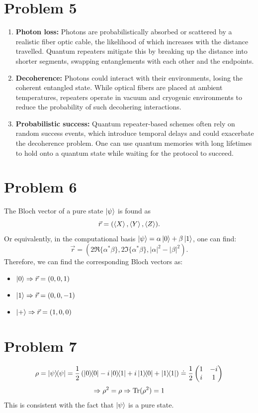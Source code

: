 \documentclass[11pt]{article}
\begin{document}
\section*{Problem 5}
\begin{enumerate}
    \item \textbf{Photon loss:}
        Photons are probabilistically absorbed or scattered by a realistic fiber optic cable,
        the likelihood of which increases with the distance travelled.
        Quantum repeaters mitigate this by breaking up the distance into shorter segments,
        swapping entanglements with each other and the endpoints.

    \item \textbf{Decoherence:}
        Photons could interact with their environments, losing the coherent entangled state.
        While optical fibers are placed at ambient temperatures,
        repeaters operate in vacuum and cryogenic environments
        to reduce the probability of such decohering interactions.

    \item \textbf{Probabilistic success:}
        Quantum repeater-based schemes often rely on random success events,
        which introduce temporal delays and could exacerbate the decoherence problem.
        One can use quantum memories with long lifetimes to hold onto a quantum state
        while waiting for the protocol to succeed.
\end{enumerate}

\section*{Problem 6}
The Bloch vector of a pure state $\ket{\psi}$ is found as
\[
    \vec{r} = (\braket{X}, \braket{Y}, \braket{Z}).
\]
Or equivalently, in the computational basis $\ket{\psi} = \alpha\ket{0} + \beta\ket{1}$,
one can find:
\[
    \vec{r} = (2\Re\{\alpha^*\beta\}, 2\Im\{\alpha^*\beta\}, |\alpha|^2- |\beta|^2).
\]
Therefore, we can find the corresponding Bloch vectors as:
\begin{itemize}
    \item $\ket{0} \Rightarrow \vec{r}=(0, 0, 1)$
    \item $\ket{1} \Rightarrow \vec{r}=(0, 0, -1)$
    \item $\ket{+} \Rightarrow \vec{r}=(1, 0, 0)$
\end{itemize}

\section*{Problem 7}
\[
    \rho
    = \ketbra{\psi}{\psi}
    = \frac{1}{2} \left(
        \ketbra{0}{0} - i\ketbra{0}{1} + i\ketbra{1}{0} + \ketbra{1}{1}
    \right)
    \doteq \frac{1}{2} \begin{pmatrix} 1 & -i \\ i & 1 \end{pmatrix}
\]
\[
    \Rightarrow \rho^2 = \rho
    \Rightarrow \operatorname{Tr}(\rho^2) = 1
\]
This is consistent with the fact that $\ket{\psi}$ is a pure state.
\end{document}

